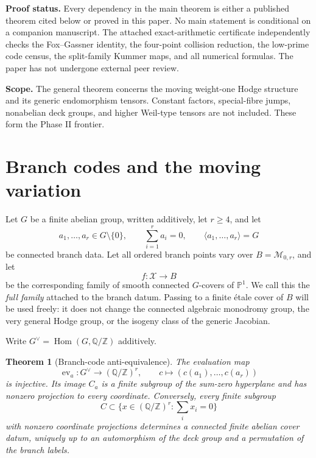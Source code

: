\documentclass[11pt]{article}
\newtheorem{theorem}{Theorem}[section]
\theoremstyle{definition}
\theoremstyle{remark}
\newcommand{\Q}{\mathbb Q}
\newcommand{\Z}{\mathbb Z}
\newcommand{\PP}{\mathbb P}
\newcommand{\M}{\mathcal M}
\newcommand{\Hom}{\operatorname{Hom}}
\begin{document}
\noindent\textbf{Proof status.}
Every dependency in the main theorem is either a published theorem cited below or proved in this paper.  No main statement is conditional on a companion manuscript.  The attached exact-arithmetic certificate independently checks the Fox--Gassner identity, the four-point collision reduction, the low-prime code census, the split-family Kummer maps, and all numerical formulas.  The paper has not undergone external peer review.

\medskip
\noindent\textbf{Scope.}
The general theorem concerns the moving weight-one Hodge structure and its generic endomorphism tensors.  Constant factors, special-fibre jumps, nonabelian deck groups, and higher Weil-type tensors are not included.  These form the Phase II frontier.

\tableofcontents

\section{Branch codes and the moving variation}

Let $G$ be a finite abelian group, written additively, let $r\ge4$, and let
\begin{equation}\label{eq:branch-data}
 a_1,\ldots,a_r\in G\setminus\{0\},\qquad
 \sum_{i=1}^r a_i=0,\qquad
 \langle a_1,\ldots,a_r\rangle=G
\end{equation}
be connected branch data.  Let all ordered branch points vary over
$B=\M_{0,r}$, and let
\[
 f:\mathcal X\longrightarrow B
\]
be the corresponding family of smooth connected $G$-covers of $\PP^1$.  We call this the \emph{full family} attached to the branch datum.  Passing to a finite \'etale cover of $B$ will be used freely: it does not change the connected algebraic monodromy group, the very general Hodge group, or the isogeny class of the generic Jacobian.

Write $G^\vee=\Hom(G,\Q/\Z)$ additively.

\begin{theorem}[Branch-code anti-equivalence]\label{thm:code-dictionary}
The evaluation map
\[
 \operatorname{ev}_a:G^\vee\longrightarrow(\Q/\Z)^r,
 \qquad
 c\longmapsto(c(a_1),\ldots,c(a_r))
\]
is injective.  Its image $C_a$ is a finite subgroup of the sum-zero hyperplane and has nonzero projection to every coordinate.  Conversely, every finite subgroup
\[
 C\subset\{x\in(\Q/\Z)^r:\textstyle\sum_i x_i=0\}
\]
with nonzero coordinate projections determines a connected finite abelian cover datum, uniquely up to an automorphism of the deck group and a permutation of the branch labels.
\end{theorem}
\end{document}
